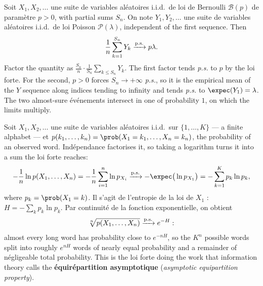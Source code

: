 \begin{example}
  Soit $X_{1}, X_{2}, \dots$ une suite de variables aléatoires i.i.d.\ de loi de
  Bernoulli $\mathcal{B}(p)$ de paramètre $p > 0$, with partial sums $S_{n}$. On
  note $Y_{1}, Y_{2}, \dots$ une suite de variables aléatoires i.i.d.\ de loi
  Poisson $\mathcal{P}(\lambda)$, independent of the first sequence. Then
  \[
    \frac{1}{n} \sum_{k=1}^{S_{n}} Y_{k} \xrightarrow{\text{p.s.}} p\lambda .
  \]
  Factor the quantity as
  $\frac{S_{n}}{n} \cdot \frac{1}{S_{n}}\sum_{k \leq S_{n}} Y_{k}$. The first
  factor tends \textit{p.s.} to $p$ by the loi forte. For the second, $p > 0$
  forces $S_{n} \to +\infty$ \textit{p.s.}, so it is the empirical mean of the
  $Y$ sequence along indices tending to infinity and tends \textit{p.s.} to
  $\expec(Y_{1}) = \lambda$. The two almost-sure événements intersect in one of
  probability $1$, on which the limits multiply.
\end{example}

\begin{example}
  Soit $X_{1}, X_{2}, \dots$ une suite de variables aléatoires i.i.d.\ sur
  $\{1, \dots, K\}$ --- a finite alphabet --- et
  $p(k_{1}, \dots, k_{n}) = \prob(X_{1} = k_{1}, \dots, X_{n} = k_{n})$,
  the probability of an observed word. Indépendance factorises it, so taking
  a logarithm turns it into a sum the loi forte reaches:
  \[
    -\frac{1}{n} \ln p(X_{1}, \dots, X_{n})
      = -\frac{1}{n}\sum_{i=1}^{n} \ln p_{X_{i}}
      \cvas -\expec\big(\ln p_{X_{1}}\big)
      = -\sum_{k=1}^{K} p_{k} \ln p_{k} ,
  \]
  where $p_{k} = \prob(X_{1} = k)$. Il s'agit de
  l'entropie de la loi de $X_{1}$ : $H = -\sum_{k} p_{k}\ln p_{k}$. Par continuité de la fonction exponentielle, on obtient
  \[
    \sqrt[n]{p(X_{1}, \dots, X_{n})} \xrightarrow{\text{p.s.}} e^{-H} :
  \]
  almost every long word has probability close to $e^{-nH}$, so the $K^{n}$
  possible words split into roughly $e^{nH}$ words of nearly equal probability
  and a remainder of négligeable total probability. This is the loi forte doing
  the work that information theory calls the \textbf{équirépartition
  asymptotique} (\textit{asymptotic equipartition property}).
\end{example}

